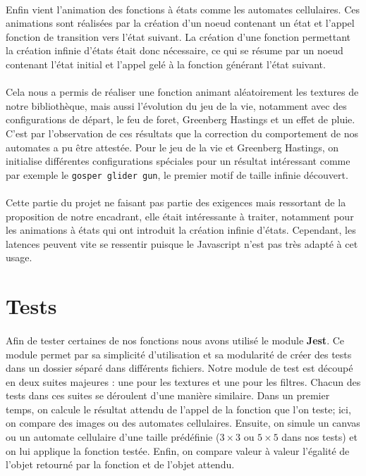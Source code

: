 \documentclass[a4paper]{article}
\begin{document}
\paragraph{}
Enfin vient l'animation des fonctions à états comme les automates cellulaires. Ces animations sont réalisées par la création d'un noeud contenant un état et l'appel fonction de transition vers l'état suivant. La création d'une fonction permettant la création infinie d'états était donc nécessaire, ce qui se résume par un noeud contenant l'état initial et l'appel gelé à la fonction générant l'état suivant.

\paragraph{}
Cela nous a permis de réaliser une fonction animant aléatoirement les textures de notre bibliothèque, mais aussi l'évolution du jeu de la vie, notamment avec des configurations de départ, le feu de foret, Greenberg Hastings et un effet de pluie. C'est par l'observation de ces résultats que la correction du comportement de nos automates a pu être attestée. Pour le jeu de la vie et Greenberg Hastings, on initialise différentes configurations spéciales pour un résultat intéressant comme par exemple le \texttt{gosper glider gun}, le premier motif de taille infinie découvert.

\paragraph{}
Cette partie du projet ne faisant pas partie des exigences mais ressortant de la proposition de notre encadrant, elle était intéressante à traiter, notamment pour les animations à états qui ont introduit la création infinie d'états. Cependant, les latences peuvent vite se ressentir puisque le Javascript n'est pas très adapté à cet usage.

\section{Tests}
\paragraph{}
Afin de tester certaines de nos fonctions nous avons utilisé le module \textbf{Jest}. Ce module permet par sa simplicité d'utilisation et sa modularité de créer des tests dans un dossier séparé dans différents fichiers. Notre module de test est découpé en deux suites majeures : une pour les textures et une pour les filtres. Chacun des tests dans ces suites se déroulent d'une manière similaire. Dans un premier temps, on calcule le résultat attendu de l'appel de la fonction que l'on teste; ici, on compare des images ou des automates cellulaires. Ensuite, on simule un canvas ou un automate cellulaire d'une taille prédéfinie ($3 \times 3$ ou $5 \times 5$ dans nos tests) et on lui applique la fonction testée. Enfin, on compare valeur à valeur l'égalité de l'objet retourné par la fonction et de l'objet attendu.
\end{document}
